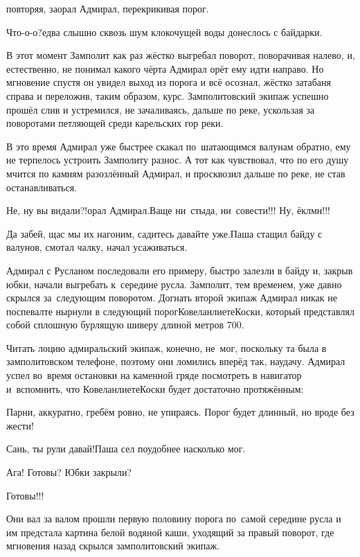 \mdash повторяя, заорал Адмирал, перекрикивая порог.

\diagdash Что-о-о?\mdash едва слышно сквозь шум клокочущей воды донеслось с байдарки.


В этот момент Замполит как раз жёстко выгребал поворот, поворачивая налево, и, естественно, не понимал какого чёрта Адмирал орёт ему идти направо. Но мгновение спустя он увидел выход из порога и всё осознал, жёстко затабаня справа и переложив, таким образом, курс. Замполитовский экипаж успешно прошёл слив и устремился, не зачаливаясь, дальше по реке, ускользая за поворотами петляющей среди карельских гор реки.  

В это время Адмирал уже быстрее скакал по~шатающимся валунам обратно, ему не терпелось устроить Замполиту разнос. А тот как чувствовал, что по его душу мчится по камням разозлённый Адмирал, и просквозил дальше по реке, не став останавливаться.

\diagdash Не, ну вы видали?!\mdash орал Адмирал.\mdash Ваще ни~стыда, ни~совести!!! Ну, ёклмн!!!

\diagdash Да забей, щас мы их нагоним, садитесь давайте уже.\mdash Паша стащил байду с валунов, смотал чалку, начал усаживаться. 

Адмирал с Русланом последовали его примеру, быстро залезли в байду и, закрыв юбки, начали выгребать к~середине русла. Замполит, тем временем, уже давно скрылся за~следующим поворотом. Догнать второй экипаж Адмирал никак не поспевал\mdash те нырнули в следующий порог\mdash Ковеланлиете\sdash Коски, который представлял собой сплошную бурлящую шиверу длиной метров 700.

Читать лоцию адмиральский экипаж, конечно, не~мог, поскольку та была в замполитовском телефоне, поэтому они ломились вперёд так, наудачу. Адмирал успел во~время остановки на каменной гряде посмотреть в навигатор и~вспомнить, что Ковеланлиете\sdash Коски будет достаточно протяжённым:

\diagdash Парни, аккуратно, гребём ровно, не упираясь. Порог будет длинный, но вроде без жести!

\diagdash Сань, ты рули давай!\mdash Паша сел поудобнее насколько мог.

\diagdash Ага! Готовы? Юбки закрыли?

\diagdash Готовы!!!

Они вал за валом прошли первую половину порога по~самой середине русла и им предстала картина белой водяной каши, уходящий за правый поворот, где мгновения назад скрылся замполитовский экипаж.

